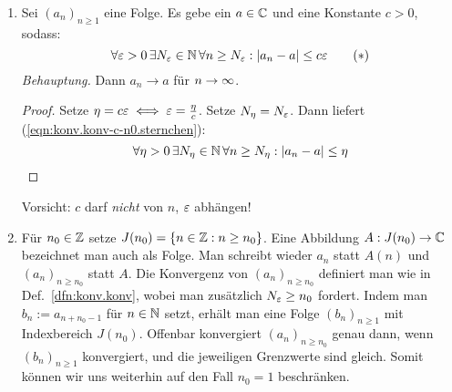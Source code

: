 \documentclass[12pt]{scrreprt}
\begin{document}
\begin{bem}
  \label{bem:konv.konv-c-n0}
  \begin{enumerate}
  \item Sei $(a_n)_{n\ge1}$ eine Folge. Es gebe ein $a\in\mathbb{C}$ und
    eine Konstante $c>0$, sodass:
    \begin{equation}\label{eqn:konv.konv-c-n0.sternchen}
      \forall\varepsilon>0\,\exists N_\varepsilon\in\mathbb{N}\,\forall n\ge
      N_\varepsilon:\left\lvert a_n-a\right\lvert\le c\varepsilon
      \tag{$*$}
    \end{equation}
    \emph{Behauptung.} Dann $a_n \to a$ für $n\rightarrow\infty$.\\
    \begin{proof} Setze $\eta=c\varepsilon \iff \varepsilon=\frac \eta c$. Setze
      $N_\eta=N_\varepsilon$. Dann liefert
      (\ref{eqn:konv.konv-c-n0.sternchen}):
      \[\forall\eta>0\,\exists N_\eta\in\mathbb{N}\,\forall n\ge
      N_\eta:\left\lvert a_n-a\right\lvert\le \eta\]
    \end{proof}
    Vorsicht: $c$ darf \emph{nicht} von $n$, $\varepsilon$
    abhängen! \label{bem:konv.konv-c-n0.a}
  \item Für $n_0\in\mathbb{Z}$ setze $J(n_0)=\{n\in\mathbb{Z}:n\ge
    n_0\}$. Eine Abbildung $A: J(n_0)\rightarrow\mathbb{C}$ bezeichnet man auch
    als Folge. Man schreibt wieder $a_n$ statt $A(n)$ und $(a_n)_{n\ge
      n_0}$ statt $A$. Die Konvergenz von $(a_n)_{n\ge n_0}$ definiert
    man wie in Def.~\ref{dfn:konv.konv}, wobei man zusätzlich
    $N_\varepsilon\ge n_0$ fordert. Indem man $b_n:=a_{n+n_0-1}$ für $n\in\mathbb{N}$
    setzt, erhält man eine Folge $(b_n)_{n\ge1}$ mit Indexbereich
    $J(n_0)$. Offenbar konvergiert $(a_n)_{n\ge n_0}$ genau dann, wenn
    $(b_n)_{n\ge1}$ konvergiert, und die jeweiligen Grenzwerte sind
    gleich. Somit können wir uns weiterhin auf den Fall $n_0=1$
    beschränken. \label{bem:konv.konv-c-n0.b}
  \end{enumerate}
\end{bem}
\end{document}
